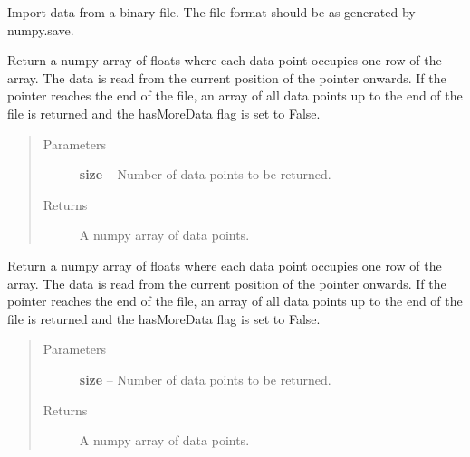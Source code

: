\documentclass[letterpaper,10pt,english]{sphinxmanual}
\begin{document}
\begin{fulllineitems}
\label{common:common_data_importer.CommonBinaryFileDataImporter}
Import data from a binary file. The file format should be as generated by numpy.save.

\begin{fulllineitems}
\label{common:common_data_importer.CommonBinaryFileDataImporter.get_data}
Return a numpy array of floats where each data point occupies one row of the array. The data is read from
the current position of the pointer onwards. If the pointer reaches the end of the file, an array of all data
points up to the end of the file is returned and the hasMoreData flag is set to False.
\begin{quote}\begin{description}
\item[{Parameters}] \leavevmode
\textbf{size} -- Number of data points to be returned.

\item[{Returns}] \leavevmode
A numpy array of data points.

\end{description}\end{quote}

\end{fulllineitems}


\begin{fulllineitems}
\label{common:common_data_importer.CommonBinaryFileDataImporter.get_outData}
Return a numpy array of floats where each data point occupies one row of the array. The data is read from
the current position of the pointer onwards. If the pointer reaches the end of the file, an array of all data
points up to the end of the file is returned and the hasMoreData flag is set to False.
\begin{quote}\begin{description}
\item[{Parameters}] \leavevmode
\textbf{size} -- Number of data points to be returned.

\item[{Returns}] \leavevmode
A numpy array of data points.


\end{description}
\end{quote}
\end{fulllineitems}
\end{fulllineitems}
\end{document}
